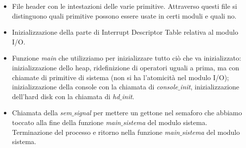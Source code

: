 \begin{itemize}
\begin{itemize}
\begin{itemize}
			\item File header con le intestazioni delle varie primitive. Attraverso questi file si distinguono quali primitive possono essere usate in certi moduli e quali no.
			\item Inizializzazione della parte di Interrupt Descriptor Table relativa al modulo I/O.
			\item Funzione \emph{main} che utilizziamo per inizializzare tutto ciò che va inizializzato: inizializzazione dello heap, ridefinizione di operatori uguali a prima, ma con chiamate di primitive di sistema (non si ha l'atomicità nel modulo I/O); inizializzazione della console con la chiamata di \emph{console$\_$init}, inizializzazione dell'hard disk con la chiamata di \emph{hd$\_$init}.
			\item Chiamata della \emph{sem$\_$signal} per mettere un gettone nel semaforo che abbiamo toccato alla fine della funzione \emph{main$\_$sistema} del modulo sistema. Terminazione del processo e ritorno nella funzione \emph{main$\_$sistema} del modulo sistema.
		\end{itemize}
	\end{itemize}
\end{itemize}